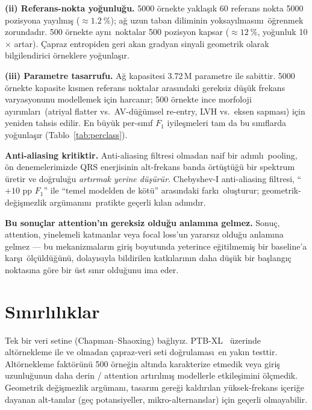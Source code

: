 \documentclass[conference]{IEEEtran}
\begin{document}
\textbf{(ii) Referans-nokta yo\u{g}unlu\u{g}u.} \num{5000} \"{o}rnekte
yakla\c{s}\i k \num{60} referans nokta \num{5000} pozisyona yay\i lm\i\c{s}
($\approx \SI{1,2}{\percent}$); a\u{g} uzun taban diliminin
yoksay\i lmas\i n\i\ \"{o}\u{g}renmek zorundad\i r. \num{500} \"{o}rnekte ayn\i\
noktalar \num{500} pozisyon kapsar ($\approx \SI{12}{\percent}$,
yo\u{g}unluk 10$\times$ artar). \c{C}apraz entropiden geri akan gradyan
sinyali geometrik olarak bilgilendirici \"{o}rneklere yo\u{g}unla\c{s}\i r.

\textbf{(iii) Parametre tasarrufu.} A\u{g} kapasitesi \num{3,72}\,M
parametre ile sabittir. \num{5000} \"{o}rnekte kapasite k\i smen referans
noktalar aras\i ndaki gereksiz d\"{u}\c{s}\"{u}k frekans varyasyonunu
modellemek i\c{c}in harcan\i r; \num{500} \"{o}rnekte ince morfoloji
ay\i r\i mlar\i\ (atriyal flatter vs.\ AV-d\"{u}\u{g}\"{u}msel re-entry,
LVH vs.\ eksen sapmas\i) i\c{c}in yeniden tahsis edilir. En b\"{u}y\"{u}k
per-s\i n\i f $F_1$ iyile\c{s}meleri tam da bu s\i n\i flarda
yo\u{g}unla\c{s}\i r (Tablo~\ref{tab:perclass}).

\textbf{Anti-aliasing kritiktir.} Anti-aliasing filtresi olmadan naif
bir ad\i ml\i\ pooling, \"{o}n denemelerimizde QRS enerjisinin alt-frekans
banda \"{o}rt\"{u}\c{s}t\"{u}\u{g}\"{u} bir spektrum \"{u}retir ve do\u{g}rulu\u{g}u
\emph{art\i rmak yerine d\"{u}\c{s}\"{u}r\"{u}r}. Chebyshev-I anti-aliasing
filtresi, ``$+10$ pp $F_1$'' ile ``temel modelden de k\"{o}t\"{u}'' aras\i ndaki
fark\i\ olu\c{s}turur; geometrik-de\u{g}i\c{s}mezlik arg\"{u}man\i n\i\
pratikte ge\c{c}erli k\i lan ad\i md\i r.

\textbf{Bu sonu\c{c}lar attention'\i n gereksiz oldu\u{g}u anlam\i na
gelmez.} Sonu\c{c}, attention, yinelemeli katmanlar veya focal loss'un
yarars\i z oldu\u{g}u anlam\i na gelmez --- bu mekanizmalar\i n giri\c{s}
boyutunda yeterince e\u{g}itilmemi\c{s} bir baseline'a kar\c{s}\i\
\"{o}l\c{c}\"{u}ld\"{u}\u{g}\"{u}n\"{u}, dolay\i s\i yla bildirilen katk\i lar\i n\i n daha
d\"{u}\c{s}\"{u}k bir ba\c{s}lang\i\c{c} noktas\i na g\"{o}re bir \"{u}st s\i n\i r
oldu\u{g}unu ima eder.

\section{S\i n\i rl\i l\i klar}
Tek bir veri setine (Chapman--Shaoxing) ba\u{g}l\i y\i z. PTB-XL\
\cite{wagner2020} \"{u}zerinde alt\"{o}rnekleme ile ve olmadan
\c{c}apraz-veri seti do\u{g}rulamas\i\ en yak\i n testtir. Alt\"{o}rnekleme
fakt\"{o}r\"{u}n\"{u} \num{500} \"{o}rne\u{g}in alt\i nda
karakterize etmedik veya giri\c{s} uzunlu\u{g}unun daha derin / attention
art\i r\i lm\i\c{s} modellerle etkile\c{s}imini \"{o}l\c{c}medik. Geometrik
de\u{g}i\c{s}mezlik arg\"{u}man\i, tasar\i m gere\u{g}i kald\i r\i lan
y\"{u}ksek-frekans i\c{c}eri\u{g}e dayanan alt-tan\i lar (ge\c{c} potansiyeller,
mikro-alternanslar) i\c{c}in ge\c{c}erli olmayabilir.
\end{document}
